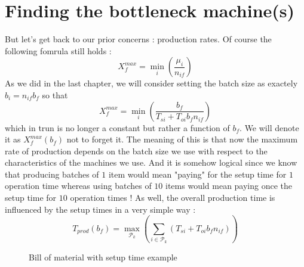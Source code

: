 \section{Finding the bottleneck machine(s)}

But let's get back to our prior concerns : production rates. Of course the following fomrula still holds : \[ X_f^{max} = \min_i\left( \frac{\mu_i}{n_{if}} \right) \]As we did in the last chapter, we will consider setting the batch size as exactely $b_i = n_{if}b_f$ so that \[ X_f^{max} = \min_i\left( \frac{b_f}{T_{si} + T_{oi}b_fn_{if}} \right) \] which in trun is no longer a constant but rather a function of $b_f$. We will denote it as $X_f^{max}(b_f)$ not to forget it. The meaning of this is that now the maximum rate of production depends on the batch size we use with respect to the characteristics of the machines we use. And it is somehow logical since we know that producing batches of $1$ item would mean "paying" for the setup time for $1$ operation time whereas using batches of $10$ items would mean paying once the setup time for $10$ operation times ! As well, the overall production time is influenced by the setup times in a very simple way : \[ T_{prod}(b_f) = \max_{\mathcal P_k}\left( \sum_{i\in\mathcal P_k}(T_{si} + T_{oi}b_fn_{if}) \right) \]

\begin{wrapfigure}[16]{l}{5cm}
    \centering
    \caption{\label{setup:bill_of_mat1}Bill of material with setup time example}
\end{wrapfigure}

